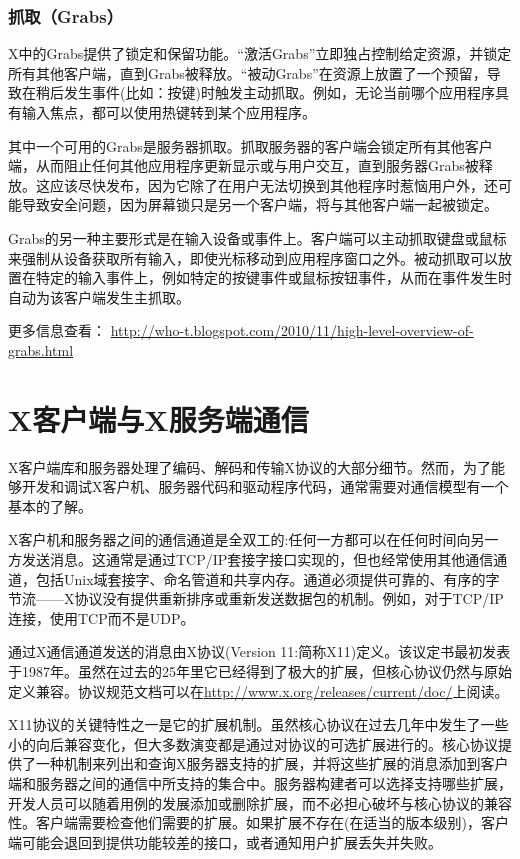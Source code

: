 \subsubsection{抓取（Grabs）}

X中的Grabs提供了锁定和保留功能。“激活Grabs”立即独占控制给定资源，并锁定所有其他客户端，直到Grabs被释放。“被动Grabs”在资源上放置了一个预留，导致在稍后发生事件(比如：按键)时触发主动抓取。例如，无论当前哪个应用程序具有输入焦点，都可以使用热键转到某个应用程序。

其中一个可用的Grabs是服务器抓取。抓取服务器的客户端会锁定所有其他客户端，从而阻止任何其他应用程序更新显示或与用户交互，直到服务器Grabs被释放。这应该尽快发布，因为它除了在用户无法切换到其他程序时惹恼用户外，还可能导致安全问题，因为屏幕锁只是另一个客户端，将与其他客户端一起被锁定。

Grabs的另一种主要形式是在输入设备或事件上。客户端可以主动抓取键盘或鼠标来强制从设备获取所有输入，即使光标移动到应用程序窗口之外。被动抓取可以放置在特定的输入事件上，例如特定的按键事件或鼠标按钮事件，从而在事件发生时自动为该客户端发生主抓取。

更多信息查看：
\url{http://who-t.blogspot.com/2010/11/high-level-overview-of-grabs.html}

\section{X客户端与X服务端通信}

X客户端库和服务器处理了编码、解码和传输X协议的大部分细节。然而，为了能够开发和调试X客户机、服务器代码和驱动程序代码，通常需要对通信模型有一个基本的了解。

X客户机和服务器之间的通信通道是全双工的:任何一方都可以在任何时间向另一方发送消息。这通常是通过TCP/IP套接字接口实现的，但也经常使用其他通信通道，包括Unix域套接字、命名管道和共享内存。通道必须提供可靠的、有序的字节流——X协议没有提供重新排序或重新发送数据包的机制。例如，对于TCP/IP连接，使用TCP而不是UDP。

通过X通信通道发送的消息由X协议(Version 11:简称X11)定义。该议定书最初发表于1987年。虽然在过去的25年里它已经得到了极大的扩展，但核心协议仍然与原始定义兼容。协议规范文档可以在\url{http://www.x.org/releases/current/doc/}上阅读。

X11协议的关键特性之一是它的扩展机制。虽然核心协议在过去几年中发生了一些小的向后兼容变化，但大多数演变都是通过对协议的可选扩展进行的。核心协议提供了一种机制来列出和查询X服务器支持的扩展，并将这些扩展的消息添加到客户端和服务器之间的通信中所支持的集合中。服务器构建者可以选择支持哪些扩展，开发人员可以随着用例的发展添加或删除扩展，而不必担心破坏与核心协议的兼容性。客户端需要检查他们需要的扩展。如果扩展不存在(在适当的版本级别)，客户端可能会退回到提供功能较差的接口，或者通知用户扩展丢失并失败。

